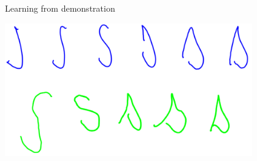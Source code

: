 \documentclass[compress]{beamer}
\begin{document}
\begin{frame}{Learning from demonstration}
    \begin{center}
    \includegraphics[width=0.8\textwidth]{cowriter/learningSdemo.png}
    \end{center}
\end{frame}

%
%
%
%
%
\end{document}
